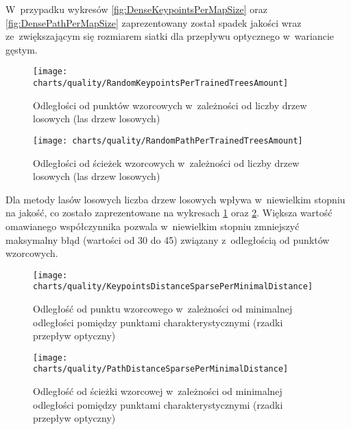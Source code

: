     W~przypadku wykresów \ref{fig:DenseKeypointsPerMapSize} oraz \ref{fig:DensePathPerMapSize} zaprezentowany został spadek jakości wraz ze~zwiększającym się rozmiarem siatki dla przepływu optycznego w~wariancie gęstym.

    \newpage
    \begin{figure}[!ht]
      \centering
      \texttt{[image: charts/quality/RandomKeypointsPerTrainedTreesAmount]}
      \caption[Odległości od punktów wzorcowych w~zależności od liczby drzew losowych]
              {Odległości od punktów wzorcowych w~zależności od liczby drzew losowych (las drzew losowych)}
      \label{fig:RandomKeypointsPerTrainedTreesAmount}
    \end{figure}

    \begin{figure}[!ht]
      \centering
      \texttt{[image: charts/quality/RandomPathPerTrainedTreesAmount]}
      \caption[Odległości od ścieżek wzorcowych w~zależności od liczby drzew losowych]
              {Odległości od ścieżek wzorcowych w~zależności od liczby drzew losowych (las drzew losowych)}
      \label{fig:RandomPathPerTrainedTreesAmount}
    \end{figure}

    Dla metody lasów losowych liczba drzew losowych wpływa w~niewielkim stopniu na jakość, co zostało zaprezentowane na wykresach \ref{fig:RandomKeypointsPerTrainedTreesAmount} oraz \ref{fig:RandomPathPerTrainedTreesAmount}. Większa wartość omawianego współczynnika pozwala w~niewielkim stopniu zmniejszyć maksymalny błąd (wartości od 30 do 45) związany z~odległością od punktów wzorcowych.

    \newpage
    \begin{figure}[!ht]
      \centering
      \texttt{[image: charts/quality/KeypointsDistanceSparsePerMinimalDistance]}
      \caption[Odległość od punktu wzorcowego w~zależności od minimalnej odległości pomiędzy punktami charakterystycznymi]
              {Odległość od punktu wzorcowego w~zależności od minimalnej odległości pomiędzy punktami charakterystycznymi (rzadki przepływ optyczny)}
      \label{fig:SpecialisedSparseKeypointsDistance}
    \end{figure}

    \begin{figure}[!ht]
      \centering
      \texttt{[image: charts/quality/PathDistanceSparsePerMinimalDistance]}
      \caption[Odległość od ścieżki wzorcowej w~zależności od minimalnej odległości pomiędzy punktami charakterystycznymi]
              {Odległość od ścieżki wzorcowej w~zależności od minimalnej odległości pomiędzy punktami charakterystycznymi (rzadki przepływ optyczny)}
      \label{fig:SpecialisedSparsePathDistance}
    \end{figure}

